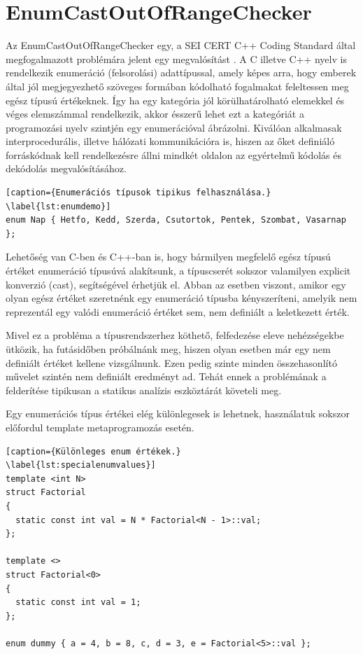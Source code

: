 \documentclass[a4paper,12pt]{report}
\begin{document}
\section{EnumCastOutOfRangeChecker}
Az EnumCastOutOfRangeChecker egy, a SEI CERT C++ Coding Standard által megfogalmazott problémára jelent egy megvalósítást \cite{securecodingint50}.
A C illetve C++ nyelv is rendelkezik enumeráció (felsorolási) adattípussal, amely képes arra, hogy emberek által jól megjegyezhető szöveges formában kódolható fogalmakat feleltessen meg egész típusú értékeknek. Így ha egy kategória jól körülhatárolható elemekkel és véges elemszámmal rendelkezik, akkor ésszerű lehet ezt a kategóriát a programozási nyelv szintjén egy enumerációval ábrázolni. Kiválóan alkalmasak interprocedurális, illetve hálózati kommunikációra is, hiszen az őket definiáló forráskódnak kell rendelkezésre állni mindkét oldalon az egyértelmű kódolás és dekódolás megvalósításához.

\begin{lstlisting}[caption={Enumerációs típusok tipikus felhasználása.}
\label{lst:enumdemo}]
enum Nap { Hetfo, Kedd, Szerda, Csutortok, Pentek, Szombat, Vasarnap };
\end{lstlisting}

Lehetőség van C-ben és C++-ban is, hogy bármilyen megfelelő egész típusú értéket enumeráció típusúvá alakítsunk, a típuscserét sokszor valamilyen explicit konverzió (cast), segítségével érhetjük el. Abban az esetben viszont, amikor egy olyan egész értéket szeretnénk egy enumeráció típusba kényszeríteni, amelyik nem reprezentál egy valódi enumeráció értéket sem, nem definiált a keletkezett érték.

Mivel ez a probléma a típusrendszerhez köthető, felfedezése eleve nehézségekbe ütközik, ha futásidőben próbálnánk meg, hiszen olyan esetben már egy nem definiált értéket kellene vizsgálnunk. Ezen pedig szinte minden összehasonlító művelet szintén nem definiált eredményt ad. Tehát ennek a problémának a felderítése tipikusan a statikus analízis eszköztárát követeli meg.

Egy enumerációs típus értékei elég különlegesek is lehetnek, használatuk sokszor előfordul template metaprogramozás esetén.

\begin{lstlisting}[caption={Különleges enum értékek.}
\label{lst:specialenumvalues}]
template <int N>
struct Factorial
{
  static const int val = N * Factorial<N - 1>::val;
};

template <>
struct Factorial<0>
{
  static const int val = 1;
};

enum dummy { a = 4, b = 8, c, d = 3, e = Factorial<5>::val };
\end{lstlisting}
\end{document}
